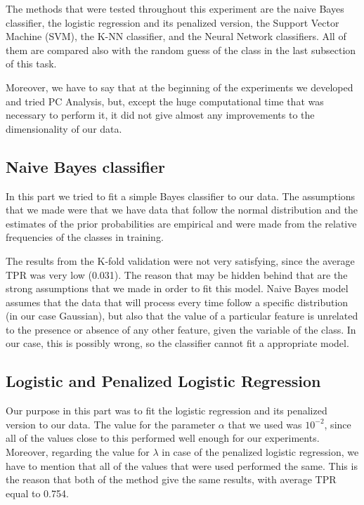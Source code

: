 \noindent The methods that were tested throughout this experiment are the naive Bayes classifier, the logistic regression and its penalized version, the Support Vector Machine (SVM), the K-NN classifier, and the Neural Network classifiers. All of them are compared also with the random guess of the class in the last subsection of this task.

\noindent Moreover, we have to say that at the beginning of the experiments we developed and tried PC Analysis, but, except the huge computational time that was necessary to perform it, it did not give almost any improvements to the dimensionality of our data.

\subsection{Naive Bayes classifier}
\noindent In this part we tried to fit a simple Bayes classifier to our data. The assumptions that we made were that we have data that follow the normal distribution and the estimates of the prior probabilities are empirical and were made from the relative frequencies of the classes in training.

\noindent The results from the K-fold validation were not very satisfying, since the average TPR was very low (0.031). The reason that may be hidden behind that are the strong assumptions that we made in order to fit this model. Naive Bayes model assumes that the data that will process every time follow a specific distribution (in our case Gaussian), but also that the value of a particular feature is unrelated to the presence or absence of any other feature, given the variable of the class. In our case, this is possibly wrong, so the classifier cannot fit a appropriate model.

\subsection{Logistic and Penalized Logistic Regression}
\noindent Our purpose in this part was to fit the logistic regression and its penalized version to our data. The value for the parameter $\alpha$ that we used was $10^{-2}$, since all of the values close to this performed well enough for our experiments. Moreover, regarding the value for $\lambda$ in case of the penalized logistic regression, we have to mention that all of the values that were used performed the same. This is the reason that both of the method give the same results, with average TPR equal to 0.754.

